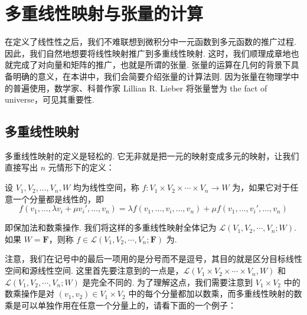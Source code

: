 \chapter{多重线性映射与张量的计算} \label{chap:多重线性映射与张量的计算}

在定义了线性性之后，我们不难联想到微积分中一元函数到多元函数的推广过程. 因此，我们自然地想要将线性映射推广到多重线性映射. 这时，我们顺理成章地也就完成了对向量和矩阵的推广，也就是所谓的张量. 张量的运算在几何的背景下具备明确的意义，在本讲中，我们会简要介绍张量的计算法则. 因为张量在物理学中的普遍使用，数学家、科普作家 Lillian R. Lieber 将张量誉为 the fact of universe，可见其重要性.

\section{多重线性映射}

多重线性映射的定义是轻松的. 它无非就是把一元的映射变成多元的映射，让我们直接写出 $n$ 元情形下的定义：

\begin{definition}{}{}
    设 $V_1, V_2, \ldots, V_n, W$ 均为线性空间，称 $f: V_1 \times V_2 \times \cdots \times V_n \to W$ 为，如果它对于任意一个分量都是线性的，即
    \[ f(v_1, \ldots, \lambda v_i + \mu v_i', \ldots, v_n) = \lambda f(v_1, \ldots, v_i, \ldots, v_n) + \mu f(v_1, \ldots, v_i', \ldots, v_n) \]

    即保加法和数乘操作. 我们将这样的多重线性映射全体记为 $\mathcal{L}(V_1, V_2, \cdots, V_n; W)$. 如果 $W = \mathbf{F}$，则称 $f \in \mathcal{L}(V_1, V_2, \cdots, V_n; \mathbf{F})$ 为.
\end{definition}

注意，我们在记号中的最后一项用的是分号而不是逗号，其目的就是区分目标线性空间和源线性空间. 这里首先要注意到的一点是，$\mathcal{L}(V_1 \times V_2 \times \cdots \times V_n, W)$ 和 $\mathcal{L}(V_1, V_2, \cdots, V_n; W)$ 是完全不同的. 为了理解这点，我们需要注意到 $V_1 \times V_2$ 中的数乘操作是对 $(v_1,v_2) \in V_1 \times V_2$ 中的每个分量都加以数乘，而多重线性映射的数乘是可以单独作用在任意一个分量上的，请看下面的一个例子：

